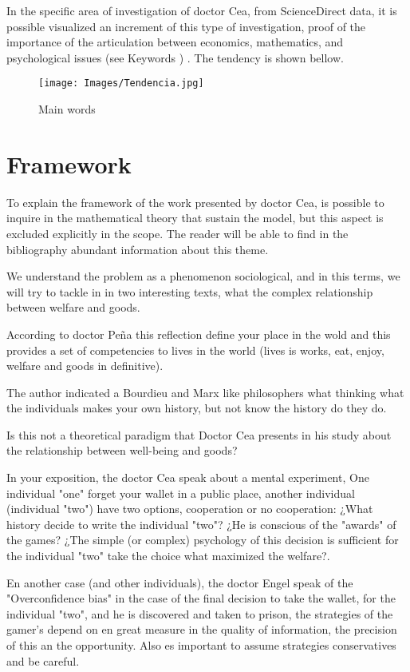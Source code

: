 \documentclass{article}
\begin{document}
In the specific area of investigation of doctor Cea, from ScienceDirect data, it is possible visualized an increment of this type of investigation, proof of the importance of the articulation between economics, mathematics, and psychological issues (see Keywords \cite{art1:articulo1}) . The tendency is shown bellow.

\begin{figure}[H]
\texttt{[image: Images/Tendencia.jpg]}
\centering
\caption{Main words}
\label{etiqueta}
\end{figure}

\section{Framework}

To explain the framework of the work presented by doctor Cea, is possible to inquire in the mathematical theory that sustain the model, but this aspect is excluded explicitly in the scope. The reader will be able to find in the bibliography abundant information about this theme.

We understand the problem as a phenomenon sociological, and in this terms, we will try to tackle in in two interesting texts, what the complex relationship between welfare and goods.

According to doctor Peña \cite{lib1:libro} this reflection define your place in the wold and this provides a set of competencies to lives in the world (lives is works, eat, enjoy, welfare and goods in definitive). 

The author indicated a Bourdieu and Marx like philosophers what thinking what the individuals makes your own history, but not know the history do they do.

Is this not a theoretical paradigm that Doctor Cea presents in his study about the relationship between well-being and goods?

In your exposition, the doctor Cea speak about a mental experiment, One individual "one" forget your wallet in a public place, another individual (individual "two") have two options, cooperation or no cooperation: ¿What history decide to write the individual "two"? ¿He is conscious of the "awards" of the games? ¿The simple (or complex) psychology of this decision is sufficient for the individual "two" take the choice what maximized the welfare?.

En another case (and other individuals), the doctor Engel \cite{web1:web} speak of the "Overconfidence bias" in the case of the final decision to take the wallet, for the individual "two", and he is discovered and taken to prison, the strategies of the gamer's depend on en great measure in the quality of information, the precision of this an the opportunity. Also es important to assume strategies conservatives and be careful.
\end{document}
